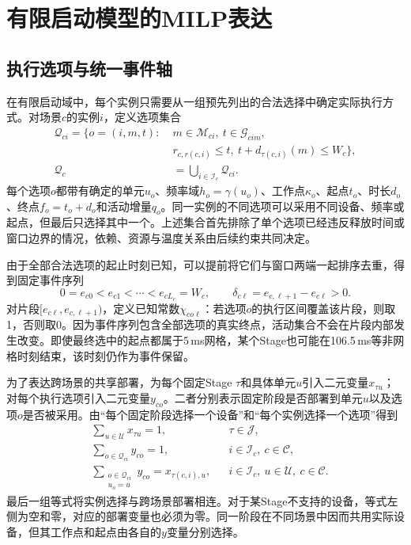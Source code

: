 \section{有限启动模型的MILP表达}

\subsection{执行选项与统一事件轴}

在有限启动域中，每个实例只需要从一组预先列出的合法选择中确定实际执行方式。对场景$c$的实例$i$，定义选项集合
\begin{equation}
 \begin{aligned}
 \mathcal Q_{ci}
 =\bigl\{o=(i,m,t):\;&m\in\mathcal M_{ci},\
 t\in\mathcal G_{cim},\\[-1mm]
 &r_{c,r(c,i)}\le t,\
 t+d_{\tau(c,i)}(m)\le W_c\bigr\},\\
 \mathcal Q_c&=\bigcup_{i\in\mathcal I_c}\mathcal Q_{ci}.
 \end{aligned}
 \label{eq:c3-options}
\end{equation}
每个选项$o$都带有确定的单元$u_o$、频率域$h_o=\gamma(u_o)$、工作点$\kappa_o$、起点$t_o$、时长$d_o$、终点$f_o=t_o+d_o$和活动增量$q_o$。同一实例的不同选项可以采用不同设备、频率或起点，但最后只选择其中一个。上述集合首先排除了单个选项已经违反释放时间或窗口边界的情况，依赖、资源与温度关系由后续约束共同决定。

由于全部合法选项的起止时刻已知，可以提前将它们与窗口两端一起排序去重，得到固定事件序列
\begin{equation}
 0=e_{c0}<e_{c1}<\cdots<e_{cL_c}=W_c,\qquad
 \delta_{c\ell}=e_{c,\ell+1}-e_{c\ell}>0.
 \label{eq:c3-events}
\end{equation}
对片段$[e_{c\ell},e_{c,\ell+1})$，定义已知常数$\chi_{co\ell}$：若选项$o$的执行区间覆盖该片段，则取1，否则取0。因为事件序列包含全部选项的真实终点，活动集合不会在片段内部发生改变。即使最终选中的起点都属于5\,ms网格，某个Stage也可能在106.5\,ms等非网格时刻结束，该时刻仍作为事件保留。

为了表达跨场景的共享部署，为每个固定Stage $\tau$和具体单元$u$引入二元变量$x_{\tau u}$；对每个执行选项引入二元变量$y_{co}$。二者分别表示固定阶段是否部署到单元$u$以及选项$o$是否被采用。由“每个固定阶段选择一个设备”和“每个实例选择一个选项”得到
\begin{equation}
 \begin{aligned}
 &\sum_{u\in\mathcal U}x_{\tau u}=1,
 &&\tau\in\mathcal J,\\
 &\sum_{o\in\mathcal Q_{ci}}y_{co}=1,
 &&i\in\mathcal I_c,\ c\in\mathcal C,\\
 &\sum_{\substack{o\in\mathcal Q_{ci}\\u_o=u}}y_{co}
       =x_{\tau(c,i),u},
 &&i\in\mathcal I_c,\ u\in\mathcal U,\ c\in\mathcal C.
 \end{aligned}
 \label{eq:c3-link}
\end{equation}
最后一组等式将实例选择与跨场景部署相连。对于某Stage不支持的设备，等式左侧为空和零，对应的部署变量也必须为零。同一阶段在不同场景中因而共用实际设备，但其工作点和起点由各自的$y$变量分别选择。

